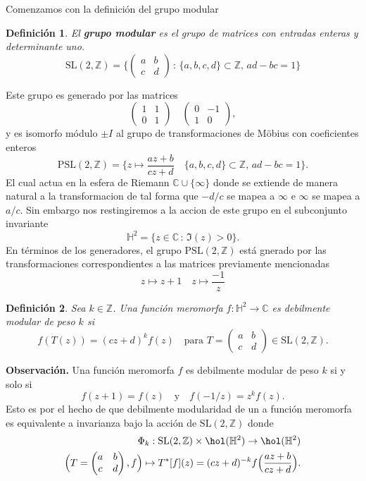 \documentclass[letterpaper]{article}
\newtheorem{def.}{Definici\'on}[section]
\newcommand{\zah}{\ensuremath{ \mathbb Z }}
\newcommand{\obs}{{\newline \noindent \sc \textbf{Observación. }}}
\newcommand{\co}{\ensuremath{\mathbb C }}
\newcommand{\pslz}{\ensuremath{\mathrm{PSL}(2,\mathbb Z) }}
\newcommand{\hd}{\ensuremath{\mathbb H^2}}
\newcommand{\slz}{\ensuremath{\mathrm{SL}(2,\mathbb Z) }}
\begin{document}
Comenzamos con la definición del grupo modular
\begin{def.}
El \textbf{grupo modular} es el grupo de matrices con entradas enteras y determinante uno.
\begin{equation}
    \slz=\Big\{ \begin{pmatrix}a & b\\ c & d \end{pmatrix} \,:\,\{a,b,c,d\}\subset\zah,\,ad-bc=1\Big\}
\end{equation}
\end{def.}
Este grupo es generado por las matrices
\[
    \begin{pmatrix}1 & 1\\ 0 & 1 \end{pmatrix}\quad\begin{pmatrix}0 & -1\\ 1 & 0 \end{pmatrix},
\]
y es isomorfo módulo \(\pm I\) al grupo de transformaciones de Möbius con coeficientes enteros
\[
    \pslz=\big\{z\mapsto\frac{az+b}{cz+d}\quad\{a,b,c,d\}\subset\zah,\,ad-bc=1\big\}.
\]
El cual actua en la esfera de Riemann \(\co\cup\{\infty\}\) donde se extiende de manera natural a la transformacion de tal forma que \(-d/c\) se mapea a \(\infty\) e \(\infty\) se mapea a \(a/c\). Sin embargo nos restingiremos a la accion de este grupo en el subconjunto invariante
\[
    \hd=\{z\in\co\,:\,\Im(z)>0\}.
\]
En términos de los generadores, el grupo \(\pslz\) está gnerado por las transformaciones correspondientes a las matrices previamente mencionadas
\[
    z\mapsto z+1\quad z\mapsto\frac{-1}{z}
\]
\begin{def.}
Sea \(k\in\zah\). Una función meromorfa \(f:\hd\rightarrow\co\) es debilmente modular de peso \(k\) si
\[
    f(T(z))=(cz+d)^{k}f(z)\quad\text{para } T=\begin{pmatrix}a & b\\ c & d \end{pmatrix}\in\slz.
\]
\end{def.}
\obs Una función meromorfa \(f\) es debilmente modular de peso \(k\) si y solo si
\[
    f(z+1)=f(z)\quad\text{y}\quad f(-1/z)=z^{k}f(z).
\]
Esto es por el hecho de que debilmente modularidad de un a función meromorfa es equivalente a invarianza bajo la acción de \(\slz\) donde
\begin{equation}\label{mod-acc}
\begin{align*}
        \Phi_k:\slz\times\hol(\hd)\rightarrow\hol(\hd)\\
        \Big(T=\begin{pmatrix}a & b\\ c & d \end{pmatrix},f\Big)\mapsto T^{*}[f](z)=(cz+d)^{-k}f\Big(\frac{az+b}{cz+d}\Big).
\end{align*}
\end{equation}
\end{document}
